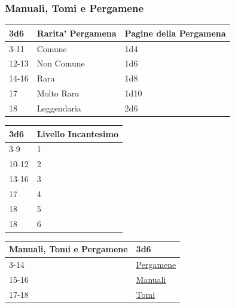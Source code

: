 \begin{multicols}{2}
{\subsubsection{Manuali, Tomi e Pergamene}\hypertarget{manualitomi}{}\label{manualitomi}\label{CPergamene}\hypertarget{CPergamene}{}

{\small \begin{tabularx}{\linewidth}{lll}
		\toprule
\rowcolor{gray!20}\textbf{3d6} & \textbf{Rarita' Pergamena} & \textbf{Pagine della Pergamena}\\
\toprule
3-11 &Comune & 1d4 \\
\rowcolor{gray!20}12-13 &Non Comune & 1d6 \\
14-16 &Rara & 1d8 \\
\rowcolor{gray!20}17 & Molto Rara & 1d10\\
18 & Leggendaria & 2d6\\
\end{tabularx}}

\medskip

{\small \begin{tabularx}{\linewidth}{ll}
		\toprule
 \rowcolor{gray!20}\textbf{3d6} & \textbf{Livello Incantesimo}\\
	\toprule
	3-9 & 1 \\
 \rowcolor{gray!20}10-12 & 2 \\
	13-16 & 3  \\
 \rowcolor{gray!20}17 & 4  \\
	18 & 5 \\
 \rowcolor{gray!20}18 & 6 \\
\end{tabularx}}

\medskip

{\small\begin{tabularx}{\linewidth}{ll}
		\toprule
  \rowcolor{gray!20}\textbf{Manuali, Tomi e Pergamene}&\textbf{3d6}\\
		\toprule
3-14 &	\hyperlink{manualitomi}{Pergamene}\\
\rowcolor{gray!20}15-16&	\hyperlink{manualitomi}{Manuali} \\
17-18&	\hyperlink{manualitomi}{Tomi}
\end{tabularx}}

\medskip\hypertarget{Manuali}{}

}
\end{multicols}
